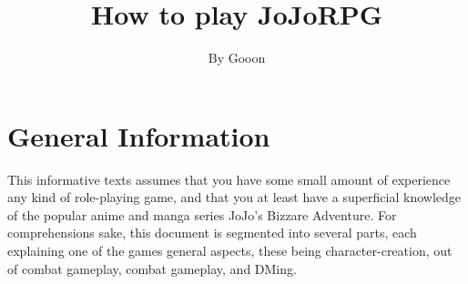\documentclass[a4paper,12pt]{article}
\begin{document}
\title{\Large{\textbf{How to play JoJoRPG}}}
\author{By Gooon}

\maketitle


\section{General Information}
This informative texts assumes that you have some small amount of experience any kind of role-playing game, and that you at least have a superficial knowledge of the popular anime and manga series JoJo's Bizzare Adventure. For comprehensions sake, this document is segmented into several parts, each explaining one of the games general aspects, these being character-creation, out of combat gameplay, combat gameplay, and DMing.
\end{document}
